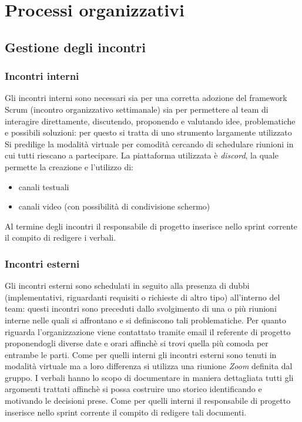 \section{Processi organizzativi}

    \subsection{Gestione degli incontri}
        \subsubsection{Incontri interni}
        Gli incontri interni sono necessari sia per una corretta adozione del framework Scrum (incontro organizzativo settimanale)
        sia per permettere al team di interagire direttamente, discutendo, proponendo e valutando idee, problematiche e possibili 
        soluzioni: per questo si tratta di uno strumento largamente utilizzato
        \newline
        Si predilige la modalità virtuale per comodità cercando di schedulare riunioni in cui tutti riescano a partecipare.
        \newline
        La piattaforma utilizzata è \textit{discord}, la quale permette la creazione e l'utilizzo di:
        \begin{itemize}
            \item canali testuali
            \item canali video (con possibilità di condivisione schermo)
        \end{itemize}
        Al termine degli incontri il responsabile di progetto inserisce nello sprint corrente il compito di redigere i verbali. 

        \subsubsection{Incontri esterni}
        Gli incontri esterni sono schedulati in seguito alla presenza di dubbi (implementativi, riguardanti requisiti o richieste di altro tipo) all'interno del 
        team: questi incontri sono preceduti dallo svolgimento di una o più riunioni interne nelle quali si affrontano e si definiscono tali problematiche.
        \newline
        Per quanto riguarda l'organizzazione viene contattato tramite email il referente di progetto proponendogli diverse date e orari affinchè si trovi quella 
        più comoda per entrambe le parti. 
        \newline
        Come per quelli interni gli incontri esterni sono tenuti in modalità virtuale ma a loro differenza si utilizza una riunione \textit{Zoom} definita dal gruppo. 
        \newline
        I verbali hanno lo scopo di documentare in maniera dettagliata tutti gli argomenti trattati affinchè si possa costruire uno storico identificando
        e motivando le decisioni prese.
        \newline
        Come per quelli interni il responsabile di progetto inserisce nello sprint corrente il compito di redigere tali documenti.

